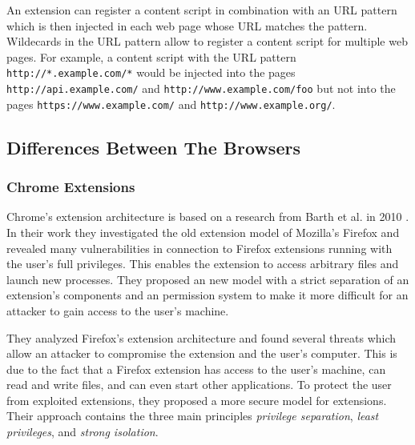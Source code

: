 	An extension can register a content script in combination with an URL pattern which is then injected in each web page whose URL matches the pattern. Wildecards in the URL pattern allow to register a content script for multiple web pages. For example, a content script with the URL pattern \texttt{http://*.example.com/*} would be injected into the pages \texttt{http://api.example.com/} and \texttt{http://www.example.com/foo} but not into the pages \texttt{https://www.example.com/} and \texttt{http://www.example.org/}.
			
\subsection{Differences Between The Browsers}

	
	
\subsubsection{Chrome Extensions}

	Chrome's extension architecture is based on a research from Barth et al. in 2010 \cite{Barth10protectingbrowsers}. In their work they investigated the old extension model of Mozilla's Firefox and revealed many vulnerabilities in connection to Firefox extensions running with the user's full privileges. This enables the extension to access arbitrary files and launch new processes. They proposed an new model with a strict separation of an extension's components and an permission system to make it more difficult for an attacker to gain access to the user's machine.
	
	
	
	 They analyzed Firefox's extension architecture and found several threats which allow an attacker to compromise the extension and the user's computer. This is due to the fact that a Firefox extension has access to the user's machine, can read and write files, and can even start other applications. To protect the user from exploited extensions, they proposed a more secure model for extensions. Their approach contains the three main principles \textit{privilege separation}, \textit{least privileges}, and \textit{strong isolation}. 
	
